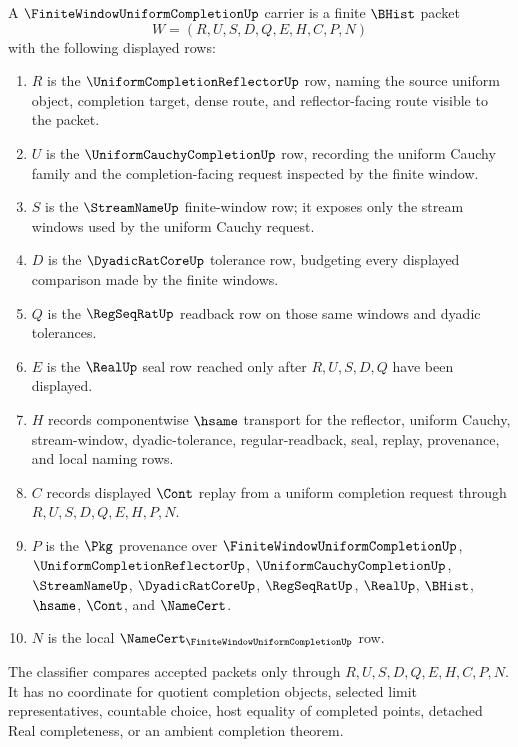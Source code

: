 \begin{definition}
\label{def:finite-window-uniform-completion-carrier}
A $\FiniteWindowUniformCompletionUp$ carrier is a finite $\BHist$ packet
$$
W=(R,U,S,D,Q,E,H,C,P,N)
$$
with the following displayed rows:
\begin{enumerate}
\item $R$ is the $\UniformCompletionReflectorUp$ row, naming the source uniform object, completion target, dense route, and reflector-facing route visible to the packet.
\item $U$ is the $\UniformCauchyCompletionUp$ row, recording the uniform Cauchy family and the completion-facing request inspected by the finite window.
\item $S$ is the $\StreamNameUp$ finite-window row; it exposes only the stream windows used by the uniform Cauchy request.
\item $D$ is the $\DyadicRatCoreUp$ tolerance row, budgeting every displayed comparison made by the finite windows.
\item $Q$ is the $\RegSeqRatUp$ readback row on those same windows and dyadic tolerances.
\item $E$ is the $\RealUp$ seal row reached only after $R,U,S,D,Q$ have been displayed.
\item $H$ records componentwise $\hsame$ transport for the reflector, uniform Cauchy, stream-window, dyadic-tolerance, regular-readback, seal, replay, provenance, and local naming rows.
\item $C$ records displayed $\Cont$ replay from a uniform completion request through $R,U,S,D,Q,E,H,P,N$.
\item $P$ is the $\Pkg$ provenance over $\FiniteWindowUniformCompletionUp$, $\UniformCompletionReflectorUp$, $\UniformCauchyCompletionUp$, $\StreamNameUp$, $\DyadicRatCoreUp$, $\RegSeqRatUp$, $\RealUp$, $\BHist$, $\hsame$, $\Cont$, and $\NameCert$.
\item $N$ is the local $\NameCert_{\FiniteWindowUniformCompletionUp}$ row.
\end{enumerate}
The classifier compares accepted packets only through $R,U,S,D,Q,E,H,C,P,N$. It has no coordinate for quotient completion objects, selected limit representatives, countable choice, host equality of completed points, detached Real completeness, or an ambient completion theorem.
\end{definition}

